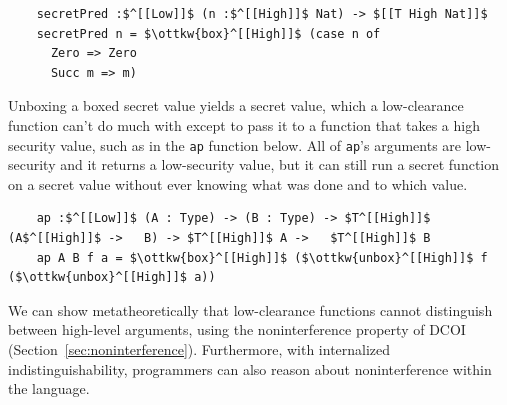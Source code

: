 \documentclass[acmsmall]{acmart}
\newcommand{\scw}[1]{}
\newcommand{\jc}[1]{}
\newcommand{\name}{DCOI\xspace}
\begin{document}
\begin{lstlisting}
    secretPred :$^[[Low]]$ (n :$^[[High]]$ Nat) -> $[[T High Nat]]$
    secretPred n = $\ottkw{box}^[[High]]$ (case n of
      Zero => Zero
      Succ m => m)
\end{lstlisting}

Unboxing a boxed secret value yields a secret value,
which a low-clearance function can't do much with except to pass it to a function
that takes a high security value, such as in the \lstinline{ap} function below.
All of \lstinline{ap}'s arguments are low-security and it returns a low-security value,
but it can still run a secret function on a secret value
without ever knowing what was done and to which value.

\begin{lstlisting}
    ap :$^[[Low]]$ (A : Type) -> (B : Type) -> $T^[[High]]$ (A$^[[High]]$ ->   B) -> $T^[[High]]$ A ->   $T^[[High]]$ B
    ap A B f a = $\ottkw{box}^[[High]]$ ($\ottkw{unbox}^[[High]]$ f ($\ottkw{unbox}^[[High]]$ a))
\end{lstlisting}

We can show metatheoretically that low-clearance functions cannot distinguish between high-level arguments,
using the noninterference property of \name{} (Section~\ref{sec:noninterference}).
Furthermore, with internalized indistinguishability, programmers can also reason about noninterference within the language.
\end{document}
